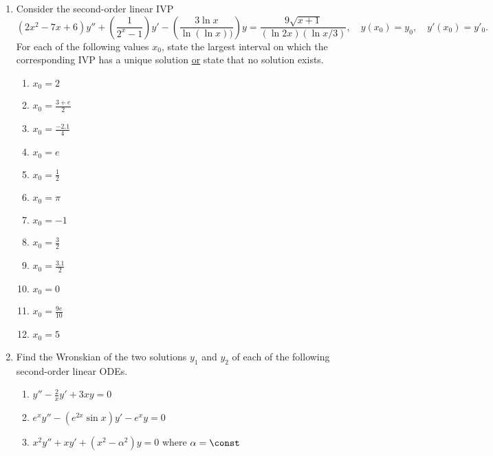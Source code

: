 \documentclass[12pt]{article}
\begin{document}
	\begin{enumerate}
		\item Consider the second-order linear IVP
		\[(2x^2-7x+6)y''+\left(\frac{1}{2^x-1}\right)y'-\left(\frac{3\ln{x}}{\ln(\ln{x}))}\right)y=\frac{9\sqrt{x+1}}{\left(\ln{2x}\right)\left(\ln{x/3}\right)},\quad y(x_0)=y_0,\quad y'(x_0)=y'_0.\]
		For each of the following values $x_0$, state the largest interval on which the corresponding IVP has a unique solution \ul{or} state that no solution exists.
		\begin{adjustwidth}{0.75in}{-1.75in}
			\begin{multicols}{2}
				\begin{enumerate}[itemsep=0.75in]
					\item $x_0=2$
					\item $x_0=\frac{3+e}{2}$
					\item $x_0=\frac{-2.1}{4}$
					\item $x_0=e$
					\item $x_0=\frac{1}{2}$
					\item $x_0=\pi$
					\item $x_0=-1$
					\item $x_0=\frac{3}{2}$
					\item $x_0=\frac{3.1}{2}$
					\item $x_0=0$
					\item $x_0=\frac{9e}{10}$
					\item $x_0=5$
				\end{enumerate}
			\end{multicols}
		\end{adjustwidth}
		
		\newpage
		
		\item Find the Wronskian of the two solutions $y_1$ and $y_2$ of each of the following second-order linear ODEs. 
		\begin{enumerate}[itemsep=1in]
			\item $y''-\frac{2}{x}y'+3xy=0$
			\item $e^xy''-\left(e^{2x}\sin{x}\right)y'-e^xy=0$
			\item $x^2y''+xy'+(x^2-\alpha^2)y=0$ where $\alpha=\const$
		\end{enumerate}
			

\end{enumerate}
\end{document}
